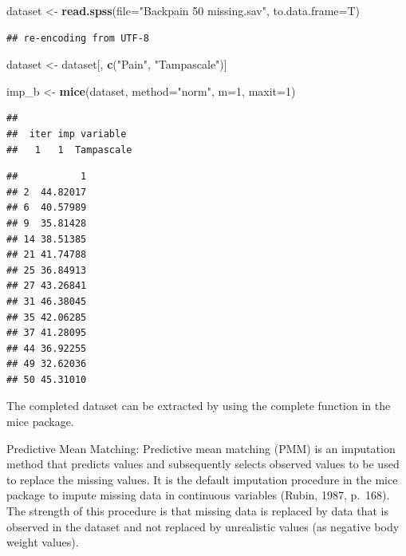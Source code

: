 \documentclass[]{book}
\newenvironment{Shaded}{\begin{snugshade}}{\end{snugshade}}
\newcommand{\KeywordTok}[1]{\textcolor[rgb]{0.13,0.29,0.53}{\textbf{#1}}}
\newcommand{\DataTypeTok}[1]{\textcolor[rgb]{0.13,0.29,0.53}{#1}}
\newcommand{\DecValTok}[1]{\textcolor[rgb]{0.00,0.00,0.81}{#1}}
\newcommand{\StringTok}[1]{\textcolor[rgb]{0.31,0.60,0.02}{#1}}
\newcommand{\CommentTok}[1]{\textcolor[rgb]{0.56,0.35,0.01}{\textit{#1}}}
\newcommand{\OperatorTok}[1]{\textcolor[rgb]{0.81,0.36,0.00}{\textbf{#1}}}
\newcommand{\NormalTok}[1]{#1}
\theoremstyle{definition}
\theoremstyle{definition}
\theoremstyle{definition}
\theoremstyle{remark}
\begin{document}
\begin{Shaded}
\begin{Highlighting}[]
\NormalTok{dataset <-}\StringTok{ }\KeywordTok{read.spss}\NormalTok{(}\DataTypeTok{file=}\StringTok{"Backpain 50 missing.sav"}\NormalTok{, }\DataTypeTok{to.data.frame=}\NormalTok{T)}
\end{Highlighting}
\end{Shaded}

\begin{verbatim}
## re-encoding from UTF-8
\end{verbatim}

\begin{Shaded}
\begin{Highlighting}[]
\NormalTok{dataset <-}\StringTok{ }\NormalTok{dataset[, }\KeywordTok{c}\NormalTok{(}\StringTok{"Pain"}\NormalTok{, }\StringTok{"Tampascale"}\NormalTok{)]}

\NormalTok{imp_b <-}\StringTok{ }\KeywordTok{mice}\NormalTok{(dataset, }\DataTypeTok{method=}\StringTok{"norm"}\NormalTok{, }\DataTypeTok{m=}\DecValTok{1}\NormalTok{, }\DataTypeTok{maxit=}\DecValTok{1}\NormalTok{)}
\end{Highlighting}
\end{Shaded}

\begin{verbatim}
## 
##  iter imp variable
##   1   1  Tampascale
\end{verbatim}

\begin{Shaded}
\end{Shaded}

\begin{verbatim}
##           1
## 2  44.82017
## 6  40.57989
## 9  35.81428
## 14 38.51385
## 21 41.74788
## 25 36.84913
## 27 43.26841
## 31 46.38045
## 35 42.06285
## 37 41.28095
## 44 36.92255
## 49 32.62036
## 50 45.31010
\end{verbatim}

The completed dataset can be extracted by using the complete function in
the mice package.

Predictive Mean Matching: Predictive mean matching (PMM) is an
imputation method that predicts values and subsequently selects observed
values to be used to replace the missing values. It is the default
imputation procedure in the mice package to impute missing data in
continuous variables (Rubin, 1987, p.~168). The strength of this
procedure is that missing data is replaced by data that is observed in
the dataset and not replaced by unrealistic values (as negative body
weight values).
\end{document}
